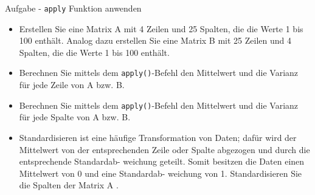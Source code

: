 \documentclass[
  ignorenonframetext,
]{beamer}
\begin{document}
\begin{frame}[fragile]{Aufgabe - \texttt{apply} Funktion anwenden}
\protect\hypertarget{aufgabe---apply-funktion-anwenden}{}

\begin{itemize}
\item
  Erstellen Sie eine Matrix A mit 4 Zeilen und 25 Spalten, die die Werte
  1 bis 100 enthält. Analog dazu erstellen Sie eine Matrix B mit 25
  Zeilen und 4 Spalten, die die Werte 1 bis 100 enthält.
\item
  Berechnen Sie mittels dem \texttt{apply()}-Befehl den Mittelwert und
  die Varianz für jede Zeile von A bzw. B.
\item
  Berechnen Sie mittels dem \texttt{apply()}-Befehl den Mittelwert und
  die Varianz für jede Spalte von A bzw. B.
\item
  Standardisieren ist eine häufige Transformation von Daten; dafür wird
  der Mittelwert von der entsprechenden Zeile oder Spalte abgezogen und
  durch die entsprechende Standardab- weichung geteilt. Somit besitzen
  die Daten einen Mittelwert von 0 und eine Standardab- weichung von 1.
  Standardisieren Sie die Spalten der Matrix A .
\end{itemize}

\end{frame}
\end{document}
